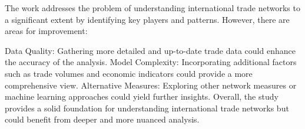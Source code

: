 \documentclass[12pt, a4paper]{article}
\begin{document}
The work addresses the problem of understanding international trade networks to a significant extent by identifying key players and patterns. However, there are areas for improvement:

Data Quality: Gathering more detailed and up-to-date trade data could enhance the accuracy of the analysis.
Model Complexity: Incorporating additional factors such as trade volumes and economic indicators could provide a more comprehensive view.
Alternative Measures: Exploring other network measures or machine learning approaches could yield further insights.
Overall, the study provides a solid foundation for understanding international trade networks but could benefit from deeper and more nuanced analysis.
\end{document}
